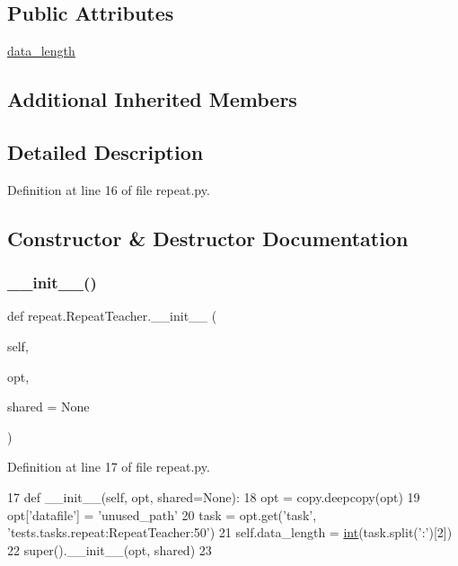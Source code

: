 \subsection*{Public Attributes}
\begin{DoxyCompactItemize}
\item 
\hyperlink{classrepeat_1_1RepeatTeacher_abc46f01649c8af2c60124d7946a95e98}{data\+\_\+length}
\end{DoxyCompactItemize}
\subsection*{Additional Inherited Members}


\subsection{Detailed Description}


Definition at line 16 of file repeat.\+py.



\subsection{Constructor \& Destructor Documentation}
\mbox{\label{classrepeat_1_1RepeatTeacher_a47b110b0dcdf457e357f1824fb348657}} 
\subsubsection{\texorpdfstring{\+\_\+\+\_\+init\+\_\+\+\_\+()}{\_\_init\_\_()}}
{\footnotesize\ttfamily def repeat.\+Repeat\+Teacher.\+\_\+\+\_\+init\+\_\+\+\_\+ (\begin{DoxyParamCaption}\item[{}]{self,  }\item[{}]{opt,  }\item[{}]{shared = {\ttfamily None} }\end{DoxyParamCaption})}



Definition at line 17 of file repeat.\+py.


\begin{DoxyCode}
17     \textcolor{keyword}{def }\_\_init\_\_(self, opt, shared=None):
18         opt = copy.deepcopy(opt)
19         opt[\textcolor{stringliteral}{'datafile'}] = \textcolor{stringliteral}{'unused\_path'}
20         task = opt.get(\textcolor{stringliteral}{'task'}, \textcolor{stringliteral}{'tests.tasks.repeat:RepeatTeacher:50'})
21         self.data\_length = \hyperlink{namespacelanguage__model_1_1eval__ppl_a7d12ee00479673c5c8d1f6d01faa272a}{int}(task.split(\textcolor{stringliteral}{':'})[2])
22         super().\_\_init\_\_(opt, shared)
23 
\end{DoxyCode}


